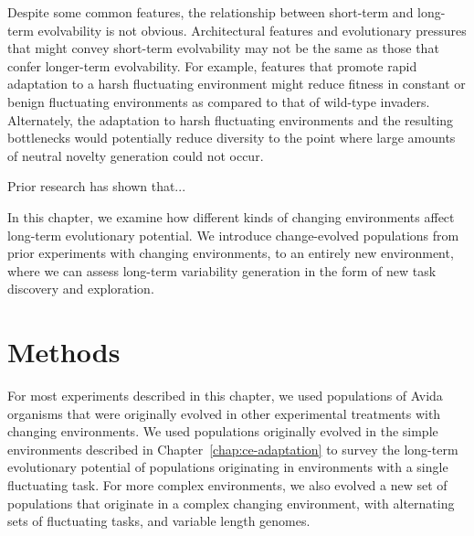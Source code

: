 \documentclass[PhD]{msu-thesis}
\begin{document}
Despite some common features, the relationship between short-term and long-term evolvability is not obvious. Architectural features and evolutionary pressures that might convey short-term evolvability may not be the same as those that confer longer-term evolvability\cite{pigliucci_is_2008}. For example, features that promote rapid adaptation to a harsh fluctuating environment might reduce fitness in constant or benign fluctuating environments as compared to that of wild-type invaders. Alternately, the adaptation to harsh fluctuating environments and the resulting bottlenecks would potentially reduce diversity to the point where large amounts of neutral novelty generation could not occur.

Prior research has shown that...


In this chapter, we examine how different kinds of changing environments affect long-term evolutionary potential. We introduce change-evolved populations from prior experiments with changing environments, to an entirely new environment, where we can assess long-term variability generation in the form of new task discovery and exploration.

\section{Methods}
For most experiments described in this chapter, we used populations of Avida organisms that were originally evolved in other experimental treatments with changing environments. We used populations originally evolved in the simple environments described in Chapter~\ref{chap:ce-adaptation} to survey the long-term evolutionary potential of populations originating in environments with a single fluctuating task. For more complex environments, we also  
evolved a new set of populations that originate in a complex changing environment, with alternating sets of fluctuating tasks, and variable length genomes.
\end{document}
